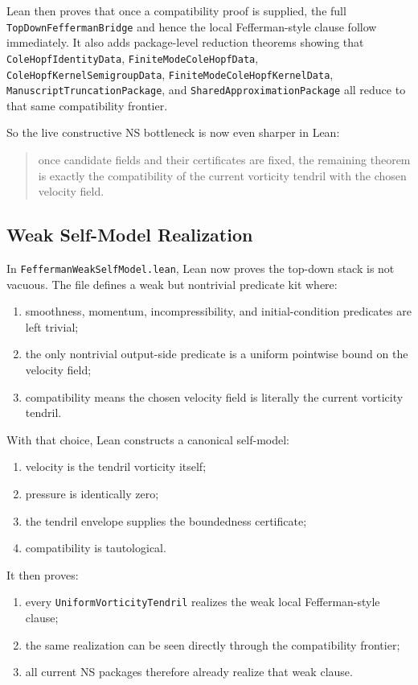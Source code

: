 \documentclass[11pt]{article}
\begin{document}
Lean then proves that once a compatibility proof is supplied, the full
\texttt{TopDownFeffermanBridge} and hence the local Fefferman-style clause
follow immediately.  It also adds package-level reduction theorems showing that
\texttt{ColeHopfIdentityData}, \texttt{FiniteModeColeHopfData},
\texttt{ColeHopfKernelSemigroupData}, \texttt{FiniteModeColeHopfKernelData},
\texttt{ManuscriptTruncationPackage}, and \texttt{SharedApproximationPackage}
all reduce to that same compatibility frontier.

So the live constructive NS bottleneck is now even sharper in Lean:
\begin{quote}
once candidate fields and their certificates are fixed, the remaining theorem is
exactly the compatibility of the current vorticity tendril with the chosen
velocity field.
\end{quote}

\subsection{Weak Self-Model Realization}

In \texttt{FeffermanWeakSelfModel.lean}, Lean now proves the top-down stack is
not vacuous.  The file defines a weak but nontrivial predicate kit where:
\begin{enumerate}[leftmargin=1.5em]
  \item smoothness, momentum, incompressibility, and initial-condition
  predicates are left trivial;
  \item the only nontrivial output-side predicate is a uniform pointwise bound
  on the velocity field;
  \item compatibility means the chosen velocity field is literally the current
  vorticity tendril.
\end{enumerate}

With that choice, Lean constructs a canonical self-model:
\begin{enumerate}[leftmargin=1.5em]
  \item velocity is the tendril vorticity itself;
  \item pressure is identically zero;
  \item the tendril envelope supplies the boundedness certificate;
  \item compatibility is tautological.
\end{enumerate}

It then proves:
\begin{enumerate}[leftmargin=1.5em]
  \item every \texttt{UniformVorticityTendril} realizes the weak local
  Fefferman-style clause;
  \item the same realization can be seen directly through the compatibility
  frontier;
  \item all current NS packages therefore already realize that weak clause.
\end{enumerate}
\end{document}

